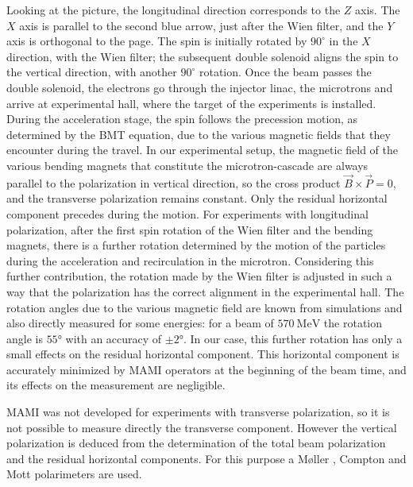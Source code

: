 Looking at the picture, the longitudinal direction corresponds to the $Z$ axis. The $X$ axis is parallel to the second blue arrow, just after the Wien filter, and the $Y$ axis is orthogonal to the page. 
The spin is initially rotated by $90^{\circ}$ in the $X$ direction, with the Wien filter; the subsequent double solenoid aligns the spin to the vertical direction, with another $90^{\circ}$ rotation. 
Once the beam passes the double solenoid, the electrons go through the injector linac, the microtrons and arrive at experimental hall, where the target of the experiments is installed. During the acceleration stage, the spin follows the precession motion, as determined by the BMT equation, due to the various magnetic fields that they encounter during the travel. In our experimental setup, the magnetic field of the various bending magnets that constitute the microtron-cascade are always parallel to the polarization in vertical direction, so the cross product $\vec{B} \times \vec{P} = 0$, and the transverse polarization remains constant. Only the residual horizontal component precedes during the motion. For experiments with longitudinal polarization, after the first spin rotation of the Wien filter and the bending magnets, there is a further rotation determined by the motion of the particles during the acceleration and recirculation in the microtron. Considering this further contribution, the rotation made by the Wien filter is adjusted in such a way that the polarization has the correct alignment in the experimental hall. The rotation angles due to the various magnetic field are known from simulations and also directly measured for some energies: for a beam of $\SI{570}{\mega \electronvolt}$ the rotation angle is $\ang{55}$ with an accuracy of $\pm \ang{2}$. In our case, this further rotation has only a small effects on the residual horizontal component. This horizontal component is accurately minimized by MAMI operators at the beginning of the beam time, and its effects on the measurement are negligible. 

MAMI was not developed for experiments with transverse polarization, so it is not possible to measure directly the transverse component. However the vertical polarization is deduced from the determination of the total beam polarization and the residual horizontal components. For this purpose a M\o ller , Compton and Mott polarimeters are used.

